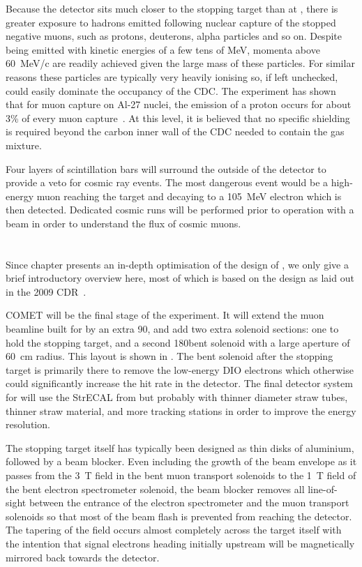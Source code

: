 Because the \phaseI detector sits much closer to the stopping target than at \phaseII, there is greater exposure to hadrons emitted following nuclear capture of the stopped negative muons, such as protons, deuterons, alpha particles and so on.
Despite being emitted with kinetic energies of a few tens of MeV, momenta above 60~MeV/c are readily achieved given the large mass of these particles.
For similar reasons these particles are typically very heavily ionising so, if left unchecked, could easily dominate the occupancy of the \ac{CDC}.
The \alcap experiment has shown that for muon capture on Al-27 nuclei, the emission of a proton occurs for about 3\% of every muon capture~\cite{NamThesis}.
At this level, it is believed that no specific shielding is required beyond the carbon inner wall of the \ac{CDC} needed to contain the gas mixture.
\FigPhaseI

Four layers of scintillation bars will surround the outside of the detector to provide a veto for cosmic ray events.
The most dangerous event would be a high-energy muon reaching the target and decaying to a 105~MeV electron which is then detected. 
Dedicated cosmic runs will be performed prior to operation with a beam in order to understand the flux of cosmic muons.

\section{\COMET \phaseII}
\FigPhaseII
Since chapter  presents an in-depth optimisation of the design of \phaseII, we only give a brief introductory overview here, most of which is based on the design as laid out in the 2009 CDR~\cite{CDRphase2}.

COMET \phaseII will be the final stage of the experiment.
It will extend the muon beamline built for \phaseI by an extra 90\degree, and add two extra solenoid sections: one to hold the stopping target, and a second 180\degree bent solenoid with a large aperture of 60~cm radius.
This layout is shown in .
The bent solenoid after the stopping target is primarily there to remove the low-energy \ac{DIO} electrons which otherwise could significantly increase the hit rate in the detector.
The final detector system for \phaseII will use the \ac{StrECAL} from \phaseI but probably with thinner diameter straw tubes, thinner straw material, and more tracking stations in order to improve the energy resolution.

The stopping target itself has typically been designed as thin disks of aluminium, followed by a beam blocker.  
Even including the growth of the beam envelope as it passes from the 3~T field in the bent muon transport solenoids to the 1~T field of the bent electron spectrometer solenoid, the beam blocker removes all line-of-sight between the entrance of the electron spectrometer and the muon transport solenoids so that most of the beam flash is prevented from reaching the detector.
The tapering of the field occurs almost completely across the target itself with the intention that signal electrons heading initially upstream will be magnetically mirrored back towards the detector.

